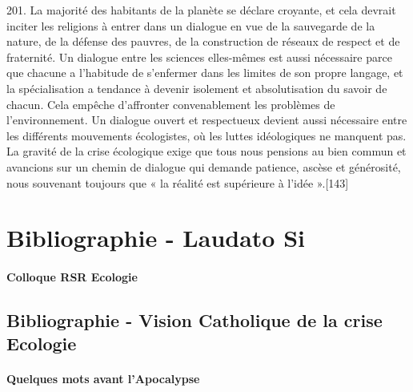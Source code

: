 \begin{singlequote}
        201. La majorité des habitants de la planète se déclare croyante, et cela devrait inciter les religions à entrer dans un dialogue en vue de la sauvegarde de la nature, de la défense des pauvres, de la construction de réseaux de respect et de fraternité. Un dialogue entre les sciences elles-mêmes est aussi nécessaire parce que chacune a l’habitude de s’enfermer dans les limites de son propre langage, et la spécialisation a tendance à devenir isolement et absolutisation du savoir de chacun. Cela empêche d’affronter convenablement les problèmes de l’environnement. Un dialogue ouvert et respectueux devient aussi nécessaire entre les différents mouvements écologistes, où les luttes idéologiques ne manquent pas. La gravité de la crise écologique exige que tous nous pensions au bien commun et avancions sur un chemin de dialogue qui demande patience, ascèse et générosité, nous souvenant toujours que « la réalité est supérieure à l’idée ».[143]
\end{singlequote}
       

\section{Bibliographie - Laudato Si}

\paragraph{Colloque RSR Ecologie} \cite{goujon_laudato_2022}



\subsection{Bibliographie - Vision Catholique de la crise Ecologie}


\paragraph{Quelques mots avant l'Apocalypse}\cite{candiard_quelques_2022}


